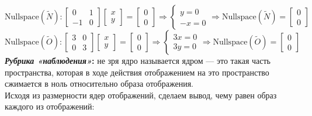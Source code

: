 \documentclass[a3paper,14pt]{extarticle}
\begin{document}
$$\text{Nullspace}(\tilde{N})\colon \begin{bmatrix}
    0 & 1 \\ -1 & 0
\end{bmatrix}\begin{bmatrix}
    x \\ y
\end{bmatrix} = \begin{bmatrix}
    0 \\ 0
\end{bmatrix} \Rightarrow \begin{cases}
    y = 0 \\ -x = 0
\end{cases}\Longrightarrow \text{Nullspace}(\tilde{N})=\begin{bmatrix}
    0 \\ 0
\end{bmatrix}$$
$$\text{Nullspace}(\tilde{O})\colon \begin{bmatrix}
    3 & 0 \\ 0 & 3
\end{bmatrix}\begin{bmatrix}
    x \\ y
\end{bmatrix} = \begin{bmatrix}
    0 \\ 0
\end{bmatrix} \Rightarrow \begin{cases}
    3x = 0 \\ 3y = 0
\end{cases}\Longrightarrow \text{Nullspace}(\tilde{O})=\begin{bmatrix}
    0 \\ 0
\end{bmatrix}$$
\textbf{\textit{Рубрика «наблюдения»}:} не зря ядро называется ядром --- это такая часть пространства, которая в ходе действия отображением на это пространство сжимается в ноль относительно образа отображения. \\[0.5em]
Исходя из размерности ядер отображений, сделаем вывод, чему равен образ каждого из отображений:
\end{document}

